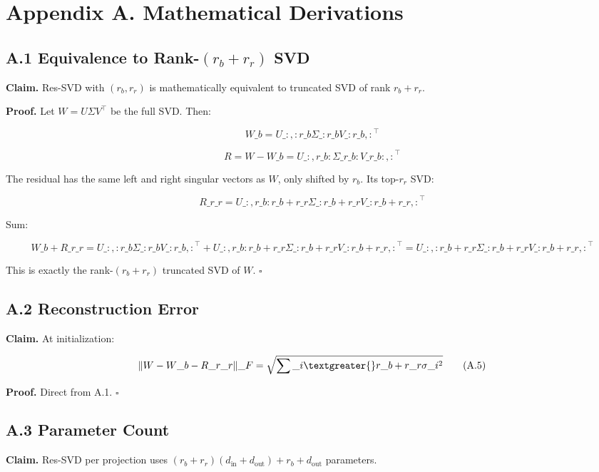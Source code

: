 \section{Appendix A. Mathematical Derivations}

\subsection{A.1 Equivalence to Rank-$(r_b + r_r)$ SVD}

\textbf{Claim.} Res-SVD with $(r_b, r_r)$ is mathematically equivalent to 
truncated SVD of rank $r_b + r_r$.

\textbf{Proof.} Let $W = U \Sigma V^\top$ be the full SVD. Then:

\[
W\_b = U\_{:, :r\_b} \Sigma\_{:r\_b} V\_{:r\_b, :}^\top
\tag{A.1}
\]

\[
R = W - W\_b = U\_{:, r\_b:} \Sigma\_{r\_b:} V\_{r\_b:, :}^\top
\tag{A.2}
\]

The residual has the same left and right singular vectors as $W$, only 
shifted by $r_b$. Its top-$r_r$ SVD:

\[
R\_{r\_r} = U\_{:, r\_b:r\_b+r\_r} \Sigma\_{:r\_b+r\_r} V\_{:r\_b+r\_r, :}^\top
\tag{A.3}
\]

Sum:

\[
W\_b + R\_{r\_r} = U\_{:, :r\_b} \Sigma\_{:r\_b} V\_{:r\_b, :}^\top + U\_{:, r\_b:r\_b+r\_r} \Sigma\_{:r\_b+r\_r} V\_{:r\_b+r\_r, :}^\top = U\_{:, :r\_b+r\_r} \Sigma\_{:r\_b+r\_r} V\_{:r\_b+r\_r, :}^\top
\tag{A.4}
\]

This is exactly the rank-$(r_b + r_r)$ truncated SVD of $W$. $\square$

\subsection{A.2 Reconstruction Error}

\textbf{Claim.} At initialization:

\[
\|W - W\_b - R\_{r\_r}\|\_F = \sqrt{\sum\_{i \textgreater{} r\_b + r\_r} \sigma\_i^2}
\tag{A.5}
\]

\textbf{Proof.} Direct from A.1. $\square$

\subsection{A.3 Parameter Count}

\textbf{Claim.} Res-SVD per projection uses $(r_b + r_r)(d_\text{in} + d_\text{out}) + r_b + d_\text{out}$ 
parameters.

